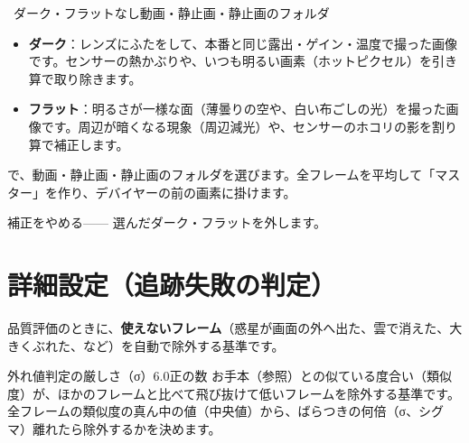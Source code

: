 \begin{setting}{\, ダーク・フラット}{なし}{動画・静止画・静止画のフォルダ}
  \begin{itemize}[itemsep=0pt, topsep=2pt]
    \item \textbf{ダーク}：レンズにふたをして、本番と同じ露出・ゲイン・温度で撮った画像です。センサーの熱かぶりや、いつも明るい画素（ホットピクセル）を引き算で取り除きます。
    \item \textbf{フラット}：明るさが一様な面（薄曇りの空や、白い布ごしの光）を撮った画像です。周辺が暗くなる現象（周辺減光）や、センサーのホコリの影を割り算で補正します。
  \end{itemize}
   で、動画・静止画・静止画のフォルダを選びます。全フレームを平均して「マスター」を作り、デバイヤーの前の画素に掛けます。
\end{setting}

\begin{setting}{ 補正をやめる}{—}{—}
  選んだダーク・フラットを外します。
\end{setting}

\section{詳細設定（追跡失敗の判定）}

品質評価のときに、\textbf{使えないフレーム}（惑星が画面の外へ出た、雲で消えた、大きくぶれた、など）を自動で除外する基準です。


\begin{setting}{ 外れ値判定の厳しさ（σ）}{6.0}{正の数}
  お手本（参照）との似ている度合い（類似度）が、ほかのフレームと比べて飛び抜けて低いフレームを除外する基準です。全フレームの類似度の真ん中の値（中央値）から、ばらつきの何倍（σ、シグマ）離れたら除外するかを決めます。
\end{setting}

